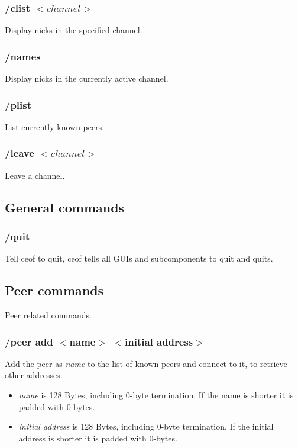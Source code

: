 \documentclass[12pt,a4paper]{book}
\begin{document}
\subsubsection{/clist $<channel>$}
Display nicks in the specified channel.

\subsubsection{/names}
Display nicks in the currently active channel.

\subsubsection{/plist}
List currently known peers.

\subsubsection{/leave $<channel>$}
Leave a channel.

\subsection{General commands}
\subsubsection{/quit}
Tell ceof to quit, ceof tells all GUIs and subcomponents to quit and quits.

\subsection{Peer commands}
Peer related commands.

\subsubsection{/peer add $<$name$>$ $<$initial address$>$}
Add the peer as \textit{name} to the list of known peers
and connect to it, to retrieve other addresses.
\begin{itemize}
\item \textit{name} is 128 Bytes, including 0-byte termination.
If the name is shorter it is padded with 0-bytes.
\item \textit{initial address} is 128 Bytes, including 0-byte termination.
If the initial address is shorter it is padded with 0-bytes.
\end{itemize}
\end{document}
